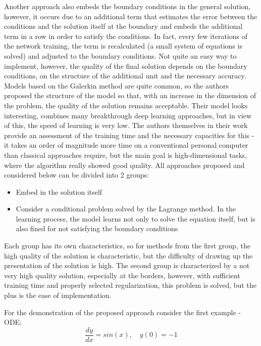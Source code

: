 Another approach \cite{cao2016locally} also embeds the boundary conditions in the general solution, however, it occurs due to an additional term that estimates the error between the conditions and the solution itself at the boundary and embeds the additional term in a row in order to satisfy the conditions. In fact, every few iterations of the network training, the term is recalculated (a small system of equations is solved) and adjusted to the boundary conditions. Not quite an easy way to implement, however, the quality of the final solution depends on the boundary conditions, on the structure of the additional unit and the necessary accuracy. Models based on the Galerkin method are quite common, so the authors \cite{Sirignano_2018} proposed the structure of the model so that, with an increase in the dimension of the problem, the quality of the solution remains acceptable. Their model looks interesting, combines many breakthrough deep learning approaches, but in view of this, the speed of learning is very low. The authors themselves in their work provide an assessment of the training time and the necessary capacities for this - it takes an order of magnitude more time on a conventional personal computer than classical approaches require, but the main goal is high-dimensional tasks, where the algorithm really showed good quality. All approaches proposed and considered below can be divided into 2 groups: 
\begin{itemize}
	\item Embed in the solution itself \cite{Lagaris_1998} \cite{liu2019solving} \cite{cao2016locally}
	\item Consider a conditional problem solved by the Lagrange method. In the learning process, the model learns not only to solve the equation itself, but is also fined for not satisfying the boundary conditions \cite{Pun_2019}
\end{itemize}
Each group has its own characteristics, so for methods from the first group, the high quality of the solution is characteristic, but the difficulty of drawing up the presentation of the solution is high. The second group is characterized by a not very high quality solution, especially at the borders, however, with sufficient training time and properly selected regularization, this problem is solved, but the plus is the ease of implementation.

For the demonstration of the proposed approach consider the first example - ODE:
\begin{equation*}
	\dfrac{d y}{d x} = sin(x), \quad y(0) = -1
\end{equation*}

